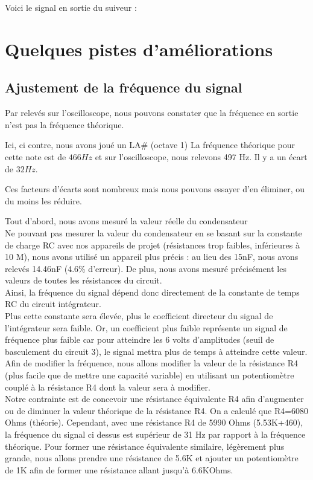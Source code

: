 {Voici le signal en sortie du suiveur :

 
\chapter{Quelques pistes d’améliorations}
\section{Ajustement de la fréquence du signal}

Par relevés sur l’oscilloscope, nous pouvons constater que la fréquence en sortie n’est pas la fréquence théorique. 


Ici, ci contre, nous avons joué un LA\# (octave 1)
La fréquence théorique pour cette note est de $466 Hz$ et sur l’oscilloscope, nous relevons 497 Hz. Il y a un écart de $32 Hz$.




Ces facteurs d’écarts sont nombreux mais nous pouvons essayer d’en éliminer, ou du moins les réduire. 

Tout d’abord, nous avons mesuré la valeur réelle du condensateur \\
Ne pouvant pas mesurer la valeur du condensateur en se basant sur la constante de charge RC avec nos appareils de projet (résistances trop faibles, inférieures à 10 M), nous avons utilisé un appareil plus précis : au lieu des 15nF, nous avons relevés 14.46nF (4.6\% d’erreur).
De plus, nous avons mesuré précisément les valeurs de toutes les résistances du circuit.\\

Ainsi, la fréquence du signal dépend donc directement de la constante de temps RC du circuit intégrateur. \\
Plus cette constante sera élevée, plus le coefficient directeur du signal de l’intégrateur sera faible.
Or, un coefficient plus faible représente un signal de fréquence plus faible car pour atteindre les 6 volts d’amplitudes (seuil de basculement du circuit 3), 
le signal mettra plus de temps à atteindre cette valeur.\\


Afin de modifier la fréquence, nous allons modifier la valeur de la résistance R4 (plus facile que de mettre une capacité variable) en utilisant un potentiomètre couplé à la résistance R4 dont la valeur sera à modifier.\\



Notre contrainte est de concevoir une résistance équivalente R4 afin d’augmenter ou de diminuer la valeur théorique de la résistance R4. 
On a calculé que R4=6080 Ohms (théorie).
Cependant, avec une résistance R4 de 5990 Ohms (5.53K+460), la fréquence du signal ci dessus est supérieur de 31 Hz par rapport à la fréquence théorique.
Pour former une résistance équivalente similaire, légèrement plus grande, nous allons prendre une résistance de 5.6K et ajouter un potentiomètre de 1K afin de former une résistance allant jusqu’à 6.6KOhms.

}

